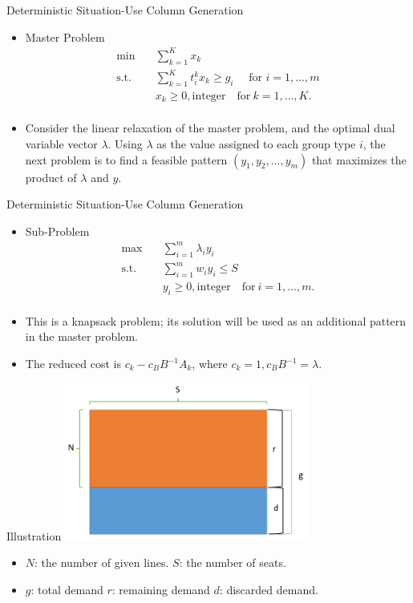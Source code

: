     \begin{frame}{Deterministic Situation-Use Column Generation}
      \begin{itemize}
        \item Master Problem
        \[\begin{split}\mbox{min}\quad & \sum_{k=1}^K x_{k}\\
 \mbox{s.t.} \quad & \sum_{k=1}^K t_i^k x_k \geq g_i  \quad  \mbox{ for } i=1,\ldots,m \\
  & x_k \geq 0, \mbox{integer}\quad \mbox{for}~ k=1,\ldots,K.\\\end{split}\]
        \item Consider the linear relaxation of the master problem, and the optimal dual variable vector $\lambda$. Using $\lambda$ as the value assigned to each group type $i$, the next problem is to find a feasible pattern $(y_1,y_2,\ldots,y_m)$ that maximizes the product of $\lambda$ and $y$.
      \end{itemize}
    \end{frame}

    \begin{frame}{Deterministic Situation-Use Column Generation}
      \begin{itemize}
        \item Sub-Problem
        \[\begin{split}\mbox{max}\quad & \sum_{i=1}^m \lambda_i y_{i}\\
        \mbox{s.t.} \quad & \sum_{i=1}^m w_i y_i \leq S  \\
        & y_i \geq 0, \mbox{integer}\quad \mbox{for}~ i=1,\ldots,m.\\\end{split}\]
        \item This is a knapsack problem; its solution will be used as an additional pattern in the master problem.
        \item The reduced cost is $c_k - c_B B^{-1}A_k$, where $c_k =1, c_B B^{-1} = \lambda$.
      \end{itemize}
    \end{frame}

    \begin{frame}{Illustration}
      \centering
      \includegraphics[width = 0.6\textwidth]{images/illu.png}
      \begin{itemize}
        \item $N$: the number of given lines. \quad $S$: the number of seats.
        \item $g$: total demand \quad $r$: remaining demand \quad $d$: discarded demand.
      \end{itemize}
    \end{frame}

